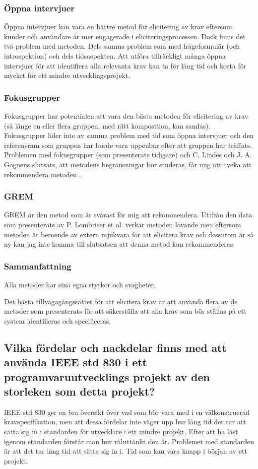 \subsubsection{Öppna intervjuer}
Öppna intervjuer kan vara en bättre metod för elicitering av krav eftersom kunder och användare är mer engagerade i eliciteringsprocessen. Dock finns det två problem med metoden. Dels samma problem som med frågeformulär (och introspektion) och dels tidsaspekten. Att utföra tillräckligt många öppna intervjuer för att identifiera alla relevanta krav kan ta för lång tid och kosta för mycket för ett mindre utvecklingsprojekt.

\subsubsection{Fokusgrupper}
Fokusgrupper har potentialen att vara den bästa metoden för elicitering av krav (så länge en eller flera gruppen, med rätt komposition, kan samlas). Fokusgrupper lider inte av samma problem med tid som öppna intervjuer och den referensram som gruppen har borde vara uppenbar efter att gruppen har träffats. Problemen med fokusgrupper (som presenterats tidigare) och C. Lindes och J. A. Goguens slutsats, att metodens begränsningar bör studeras, får mig att tveka att rekommendera metoden \cite{goguen1993techniques}.

\subsubsection{GREM}
GREM är den metod som är svårast för mig att rekommendera. Utifrån den data som presenterats av P. Lombriser et al. \cite{lombriser2016gamified} verkar metoden lovande men eftersom metoden är beroende av extern mjukvara för att elicitera krav och dessutom är så ny kan jag inte komma till slutsatsen att denna metod kan rekommenderas.

\subsubsection{Sammanfattning}
Alla metoder har sina egna styrkor och svagheter.

Det bästa tillvägagångssättet för att elicitera krav är att använda flera av de metoder som presenterats för att säkerställa att alla krav som bör ställas på ett system identifieras och specificeras.        

\subsection{Vilka fördelar och nackdelar finns med att använda IEEE std 830 i ett programvaruutvecklings projekt av den storleken som detta projekt?}
IEEE std 830 ger en bra översikt över vad som bör vara med i en välkonstruerad kravspecifikation, men att dessa fördelar inte väger upp hur lång tid det tar att sätta sig in i standarden för utvecklare i ett mindre projekt. Efter att ha läst igenom standarden förstår man hur väluttänkt den är. Problemet med standarden är att det tar lång tid att sätta sig in i. Tid som kan vara knapp i början av ett projekt. 
